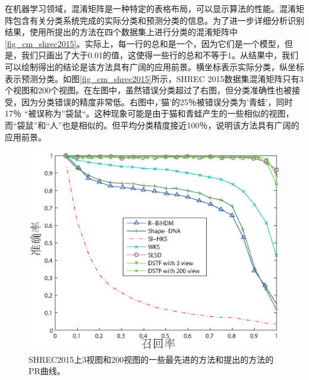 在机器学习领域，混淆矩阵是一种特定的表格布局，可以显示算法的性能。混淆矩阵包含有关分类系统完成的实际分类和预测分类的信息。为了进一步详细分析识别结果，使用所提出的方法在四个数据集上进行分类的混淆矩阵中 \ref{fig_cm_shrec2015}。实际上，每一行的总和是一个，因为它们是一个模型，但是，我们只画出了大于0.01的值，这使得一些行的总和不等于$ 1 $。从结果中，我们可以绘制得出的结论是该方法具有广阔的应用前景。横坐标表示实际分类，纵坐标表示预测分类。如图\ref{fig_cm_shrec2015}所示，SHREC 2015数据集混淆矩阵只有3个视图和200个视图。在左图中，虽然错误分类超过了右图，但分类准确性也被接受，因为分类错误的精度非常低。右图中，'猫'的25％被错误分类为'青蛙'，同时17％ “被误称为”袋鼠“。这种现象可能是由于猫和青蛙产生的一些相似的视图，而“袋鼠”和“人”也是相似的。但平均分类精度接近100％，说明该方法具有广阔的应用前景。
\begin{figure}[tbhp]
\begin{center}
\includegraphics[width=1\linewidth]{figures/all_rp_cl_shrec2015.eps}
\end{center} 
\vspace{-4mm}
\caption{SHREC2015上3视图和200视图的一些最先进的方法和提出的方法的PR曲线。} \label{fig_rp_shrec2015}
\end{figure}




